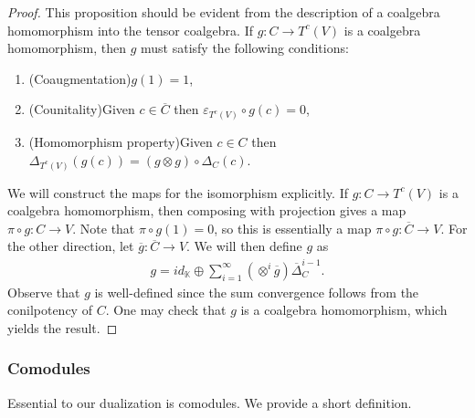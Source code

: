 \documentclass[../thesis.tex]{subfiles}
\begin{document}
            \begin{proof}
                This proposition should be evident from the description of a coalgebra homomorphism into the tensor coalgebra. If $g:C\rightarrow T^c(V)$ is a coalgebra homomorphism, then $g$ must satisfy the following conditions:
                \begin{enumerate}
                    \item (Coaugmentation)\quad $g(1)=1$,
                    \item (Counitality)\quad Given $c\in \overline{C}$ then $\varepsilon_{T^c(V)}\circ g(c)=0$,
                    \item (Homomorphism property)\quad Given $c\in C$ then $\Delta_{T^c(V)}(g(c))=(g\otimes g)\circ\Delta_C(c)$.
                \end{enumerate}

                We will construct the maps for the isomorphism explicitly. If $g: C\rightarrow T^c(V)$ is a coalgebra homomorphism, then composing with projection gives a map $\pi\circ g: C\rightarrow V$. Note that $\pi\circ g(1)=0$, so this is essentially a map $\pi\circ g:\overline{C}\rightarrow V$. For the other direction, let $\overline{g}:\overline{C}\rightarrow V$. We will then define $g$ as
                \begin{align*}
                    g = id_{\mathbb{K}} \oplus \sum_{i=1}^{\infty}(\otimes^{i}\overline{g})\overline{\Delta}_C^{i-1}.
                \end{align*}
                Observe that $g$ is well-defined since the sum convergence follows from the conilpotency of $C$. One may check that $g$ is a coalgebra homomorphism, which yields the result.
            \end{proof}

            \subsubsection*{Comodules}

                Essential to our dualization is comodules. We provide a short definition.
\end{document}
